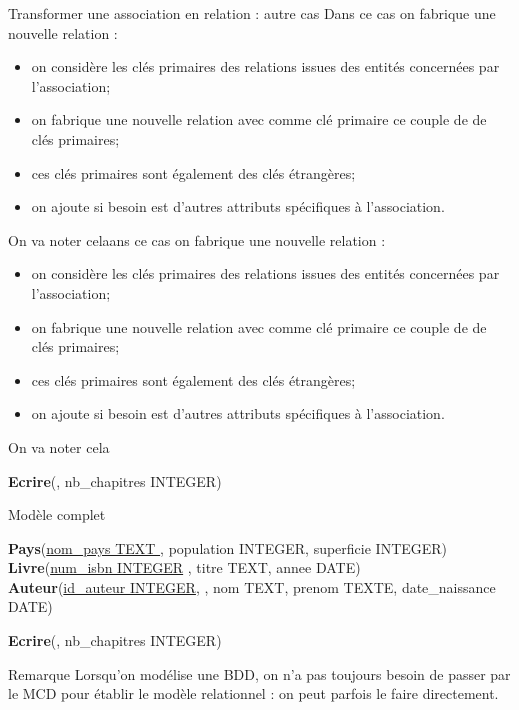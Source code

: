 \documentclass[10pt]{beamer}
\begin{document}
\begin{frame}{Transformer une association en relation : autre cas}
	Dans ce cas on fabrique une nouvelle relation :
	\begin{itemize}
		\item on considère les clés primaires des relations issues des entités concernées par l'association;
		\item on fabrique une \alert{nouvelle relation} avec comme clé primaire ce couple de de clés primaires;
		\item ces clés primaires sont également des \alert{clés étrangères};
		\item on ajoute si besoin est d'autres attributs spécifiques à l'association.
	\end{itemize}
	On va noter celaans ce cas on fabrique une nouvelle relation :
	\begin{itemize}
		\item on considère les clés primaires des relations issues des entités concernées par l'association;
		\item on fabrique une \alert{nouvelle relation} avec comme clé primaire ce couple de de clés primaires;
		\item ces clés primaires sont également des \alert{clés étrangères};
		\item on ajoute si besoin est d'autres attributs spécifiques à l'association.
	\end{itemize}
	On va noter cela

	\textbf{Ecrire}(\uline{}, nb\_chapitres INTEGER)\\
\end{frame}
\begin{frame}{Modèle complet}

	{\footnotesize
		\textbf{Pays}(\uline{nom\_pays TEXT }, population INTEGER, superficie INTEGER)\\

		\textbf{Livre}(\uline{num\_isbn INTEGER} , titre TEXT, annee DATE)\\

		{\scriptsize\textbf{Auteur}(\uline{id\_auteur INTEGER},  , nom TEXT, prenom TEXTE, date\_naissance DATE)\\}

		\textbf{Ecrire}(\uline{}, nb\_chapitres INTEGER)}

\end{frame}
\begin{frame}{Remarque}
	Lorsqu'on modélise une BDD, on n'a pas toujours besoin de passer par le MCD pour établir le modèle relationnel : on peut parfois le faire directement.
\end{frame}
\end{document}
